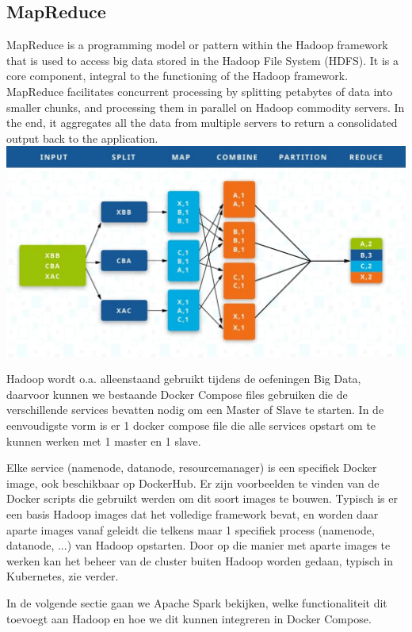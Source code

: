 \subsection{MapReduce}
MapReduce is a programming model or pattern within the Hadoop framework that is used to access big data stored in the Hadoop File System (HDFS). It is a core component, integral to the functioning of the Hadoop framework.
MapReduce facilitates concurrent processing by splitting petabytes of data into smaller chunks, and processing them in parallel on Hadoop commodity servers. In the end, it aggregates all the data from multiple servers to return a consolidated output back to the application.\autocite{Talend2023}
\includegraphics{mapreduce.png}

Hadoop wordt o.a. alleenstaand gebruikt tijdens de oefeningen Big Data, daarvoor kunnen we bestaande Docker Compose files gebruiken die de verschillende services bevatten nodig om een Master of Slave te starten.
In de eenvoudigste vorm is er 1 docker compose file die alle services opstart om te kunnen werken met 1 master en 1 slave.

Elke service (namenode, datanode, resourcemanager) is een specifiek Docker image, ook beschikbaar op DockerHub. Er zijn voorbeelden te vinden van de Docker scripts die gebruikt werden om dit soort images te bouwen. Typisch is er een basis Hadoop images dat het volledige framework bevat, en worden daar aparte images vanaf geleidt die telkens maar 1 specifiek process (namenode, datanode, ...) van Hadoop opstarten.
Door op die manier met aparte images te werken kan het beheer van de cluster buiten Hadoop worden gedaan, typisch in Kubernetes, zie verder.

In de volgende sectie gaan we Apache Spark bekijken, welke functionaliteit dit toevoegt aan Hadoop en hoe we dit kunnen integreren in Docker Compose.

